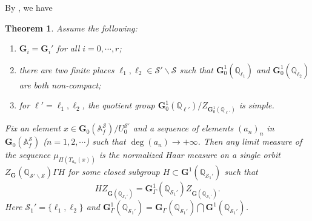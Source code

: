 \documentclass[11pt,oneside,reqno]{amsart}
\newcommand{\bfG}{\mathbf{G}}
\newcommand{\Q}{\mathbb{Q}}
\newcommand{\Scal}{\mathcal{S}}
\newcommand{\Gbf}{\mathbf{G}}
\newcommand{\bcS}{\mathcal{S}}
\theoremstyle{plain}
\newtheorem{theorem}{Theorem}[section]
\begin{document}
	By \cite[Theorem 1.4]{EinsiedlerLindenstrauss2019}, we have
	\begin{theorem}\label{limit measure invariant under G'}
		Assume the following:
		\begin{enumerate}
			\item 
			$\Gbf_i=\Gbf_i'$ for all $i=0,\cdots,r$;
			
			
			
			\item 
			there are two finite places $\ell_1,\ell_2\in{\bcS'}\backslash\bcS$ such that $\bfG_0^1(\Q_{\ell_1})$ and $\bfG_0^1(\Q_{\ell_2})$ are both non-compact;
			
			
			
			\item 
			for $\ell'=\ell_1,\ell_2$, the quotient group $\Gbf_0^1(\Q_{\ell'})/Z_{\Gbf_0^1(\Q_{\ell'})}$ is simple.
		\end{enumerate}
		Fix an element $x\in\bfG_0(\mathbb{A}_f^{\bcS})/U_0^{\bcS'}$ and a sequence of elements $(a_n)_n$ in $\bfG_0(\mathbb{A}_f^{\bcS})$ ($n=1,2,\cdots$) such that $\deg(a_n)\to +\infty$. Then any limit measure of the sequence $\mu_{\Pi(T_{a_n}(x))}$ is the normalized Haar measure on a single orbit $Z_{\Gbf}(\Q_{{\bcS'}\backslash\bcS})\Gamma H$ for some closed subgroup $H\subset\Gbf^1(\Q_{\Scal_1'})$ such that
		\[
		HZ_{\Gbf(\Q_{\Scal_1'})}
		=\Gbf_\Gamma^1(\Q_{\Scal_1'})Z_{\Gbf(\Q_{\Scal_1'})}.
		\]
		Here $\Scal_1'=\{\ell_1,\ell_2\}$ and $\Gbf_\Gamma^1(\Q_{\Scal_1'})=\Gbf_\Gamma(\Q_{\Scal_1'})\bigcap\Gbf^1(\Q_{\Scal_1'})$.
	\end{theorem}
\end{document}
